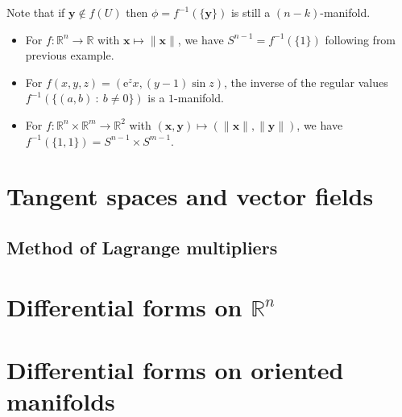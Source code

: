 \documentclass[letter-paper]{tufte-book}
\newenvironment{example}[1][Example]{\begin{trivlist}
\item[\hskip \labelsep {\bfseries #1}]}{\end{trivlist}}
\newcommand{\ex}{\mathrm{e}}
\begin{document}
Note that if $\boldsymbol{y} \notin f(U)$ then $\phi =
f^{-1}(\{\boldsymbol{y}\})$ is still a $(n-k)$-manifold.

\begin{example}
  \begin{itemize}
    \item For $f:\mathbb{R}^n \to \mathbb{R}$ with $\boldsymbol{x} \mapsto
    \|\boldsymbol{x}\|$, we have $S^{n-1} = f^{-1}(\{1\})$ following from
    previous example.
    
    \item For $f(x,y,z) = (\ex^z x, (y-1) \sin z)$, the inverse of the regular
    values $f^{-1}(\{(a,b)\ :\ b\neq 0\})$ is a $1$-manifold.
    
    \item For $f:\mathbb{R}^n \times \mathbb{R}^m \to \mathbb{R}^2$ with
    $(\boldsymbol{x}, \boldsymbol{y}) \mapsto (\|\boldsymbol{x}\|,
    \|\boldsymbol{y}\|)$, we have $f^{-1}(\{1, 1\}) = S^{n-1} \times S^{m-1}$.
  \end{itemize}
\end{example}


\chapter{Tangent spaces and vector fields}


\section{Method of Lagrange multipliers}


\chapter{Differential forms on $\mathbb{R}^n$}


\chapter{Differential forms on oriented manifolds}
\end{document}
